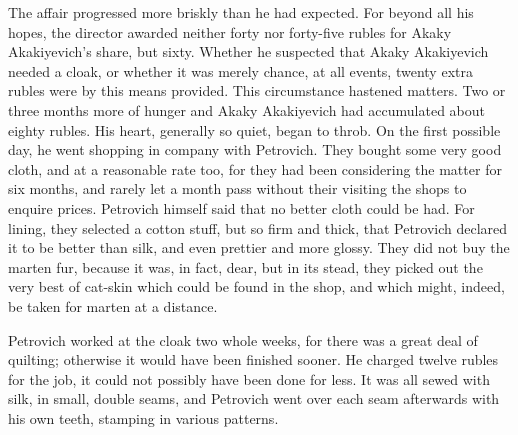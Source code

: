 The affair progressed more briskly than he had expected. For beyond
all his hopes, the director awarded neither forty nor forty-five
rubles for Akaky Akakiyevich's share, but sixty. Whether he suspected
that Akaky Akakiyevich needed a cloak, or whether it was merely
chance, at all events, twenty extra rubles were by this means
provided. This circumstance hastened matters. Two or three months more
of hunger and Akaky Akakiyevich had accumulated about eighty rubles.
His heart, generally so quiet, began to throb. On the first possible
day, he went shopping in company with Petrovich. They bought some very
good cloth, and at a reasonable rate too, for they had been
considering the matter for six months, and rarely let a month pass
without their visiting the shops to enquire prices. Petrovich himself
said that no better cloth could be had. For lining, they selected a
cotton stuff, but so firm and thick, that Petrovich declared it to be
better than silk, and even prettier and more glossy. They did not buy
the marten fur, because it was, in fact, dear, but in its stead, they
picked out the very best of cat-skin which could be found in the shop,
and which might, indeed, be taken for marten at a distance.

Petrovich worked at the cloak two whole weeks, for there was a great
deal of quilting; otherwise it would have been finished sooner. He
charged twelve rubles for the job, it could not possibly have been
done for less. It was all sewed with silk, in small, double seams, and
Petrovich went over each seam afterwards with his own teeth, stamping
in various patterns.

